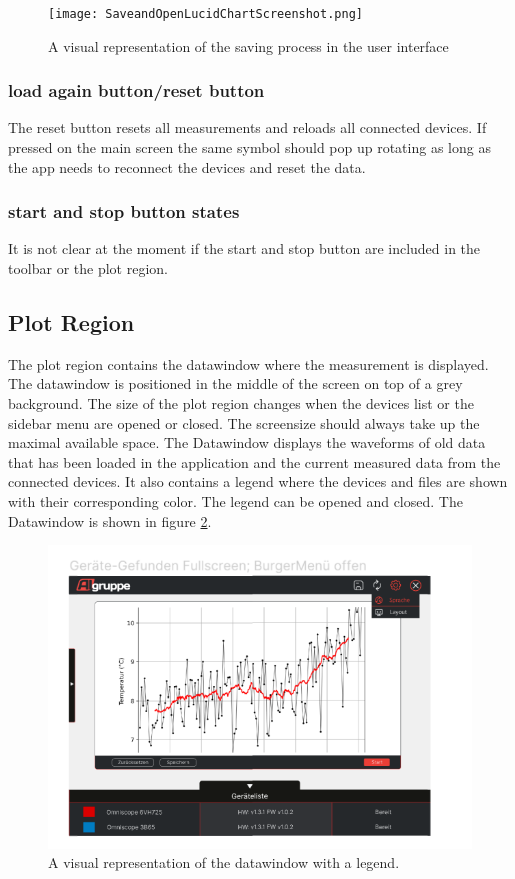 \documentclass[]{scrreprt}
\begin{document}
\begin{figure}
    \texttt{[image: SaveandOpenLucidChartScreenshot.png]}
    \caption[]{A visual representation of the saving process in the user interface}
    \label{fig:saveData}
\end{figure}

\subsubsection{load again button/reset button}

The reset button resets all measurements and reloads all connected devices. If pressed on the main screen the same symbol should pop up rotating as long as the app needs to reconnect the devices and reset the data. 


\subsubsection{start and stop button states}

It is not clear at the moment if the start and stop button are included in the toolbar or the plot region.



\subsection{Plot Region}

The plot region contains the datawindow where the measurement is displayed.
The datawindow is positioned in the middle of the screen on top of a grey background. The size of the plot region changes when the devices list or the sidebar menu are opened or closed. The screensize should always take up the maximal available space. 
The Datawindow displays the waveforms of old data that has been loaded in the application and the current measured data from the connected devices. It also contains a legend where the devices and files are shown with their corresponding color. The legend can be opened and closed. 
The Datawindow is shown in figure \ref{fig: datawindow}.\\
\begin{figure}
    \includegraphics[width=.9\textwidth]{assets/pictures/Mainwindowopen.png}
    \caption[]{A visual representation of the datawindow with a legend.}
    \label{fig: datawindow}
\end{figure}
\end{document}
